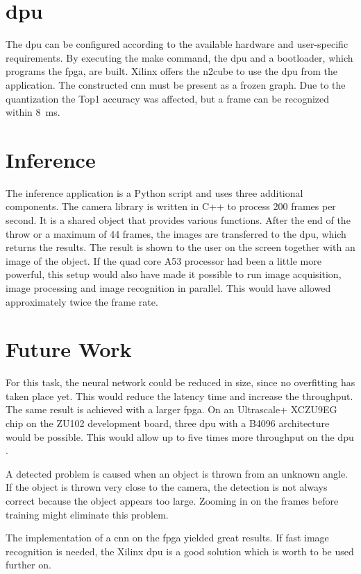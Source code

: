 \section{\Acrlong{dpu}}
\label{sec:conclusion:dpu}
The \acrshort{dpu} can be configured according to the available hardware and user-specific requirements.
By executing the make command, the \acrshort{dpu} and a bootloader, which programs the \acrshort{fpga}, are built.
Xilinx offers the \acrshort{n2cube}  to use the \acrshort{dpu} from the application.
The constructed \acrshort{cnn} must be present as a frozen graph.
Due to the quantization the Top1 accuracy was affected, but a frame can be recognized within \SI{8}{ms}. 

\section{Inference}
\label{sec:conclusion:inference}
The inference application is a Python script and uses three additional components.
The camera library is written in C++ to process 200 frames per second.
It is a shared object that provides various functions.
After the end of the throw or a maximum of 44 frames, the images are transferred to the \acrshort{dpu}, which returns the results.
The result is shown to the user on the screen together with an image of the object.
If the quad core A53 processor had been a little more powerful, this setup would also have made it possible to run image acquisition, image processing and image recognition in parallel.
This would have allowed approximately twice the frame rate. 

\section{Future Work}
\label{sec:conclusion:future_work}
For this task, the neural network could be reduced in size, since no overfitting has taken place yet.
This would reduce the latency time and increase the throughput.
The same result is achieved with a larger \acrshort{fpga}.
On an Ultrascale+ XCZU9EG chip on the ZU102 development board, three \acrshort{dpu}  with a B4096 architecture would be possible.
This would allow up to five times more throughput on the \acrshort{dpu} \cite{dpu_product_guide}.

A detected problem is caused when an object is thrown from an unknown angle. 
If the object is thrown very close to the camera, the detection is not always correct because the object appears too large.
Zooming in on the frames before training might eliminate this problem.

The implementation of a \acrlong{cnn} on the \acrshort{fpga} yielded great results.
If fast image recognition is needed, the Xilinx \acrshort{dpu} is a good solution which is worth to be used further on.
